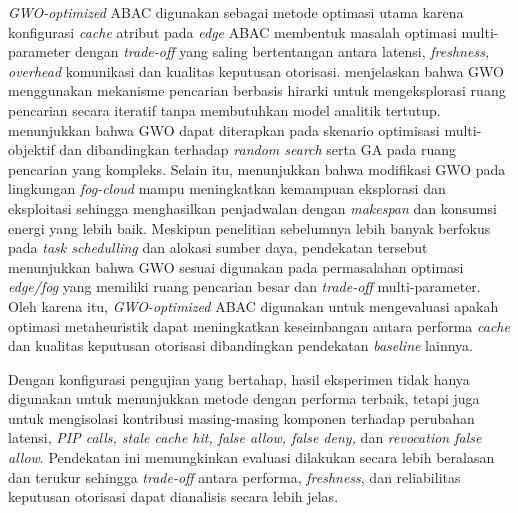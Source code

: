 \textit{GWO-optimized} ABAC digunakan sebagai metode optimasi utama karena konfigurasi \textit{cache} atribut pada \textit{edge} ABAC membentuk masalah optimasi multi-parameter dengan \textit{trade-off} yang saling bertentangan antara latensi, \textit{freshness, overhead} komunikasi dan kualitas keputusan otorisasi. \textcite{mirjalili_grey_2014} menjelaskan bahwa GWO menggunakan mekanisme pencarian berbasis hirarki untuk mengeksplorasi ruang pencarian secara iteratif tanpa membutuhkan model analitik tertutup. \textcite{feng_dynamic_2025} menunjukkan bahwa GWO dapat diterapkan pada skenario optimisasi multi-objektif dan dibandingkan terhadap \textit{random search} serta GA pada ruang pencarian yang kompleks. Selain itu, \textcite{alsadie_modified_2025} menunjukkan bahwa modifikasi GWO pada lingkungan \textit{fog-cloud} mampu meningkatkan kemampuan eksplorasi dan eksploitasi sehingga menghasilkan penjadwalan dengan \textit{makespan} dan konsumsi energi yang lebih baik. Meskipun penelitian sebelumnya lebih banyak berfokus pada \textit{task schedulling} dan alokasi sumber daya, pendekatan tersebut menunjukkan bahwa GWO sesuai digunakan pada permasalahan optimasi \textit{edge/fog} yang memiliki ruang pencarian besar dan \textit{trade-off} multi-parameter. Oleh karena itu, \textit{GWO-optimized} ABAC digunakan untuk mengevaluasi apakah optimasi metaheuristik dapat meningkatkan keseimbangan antara performa \textit{cache} dan kualitas keputusan otorisasi dibandingkan pendekatan \textit{baseline} lainnya.

Dengan konfigurasi pengujian yang bertahap, hasil eksperimen tidak hanya digunakan untuk menunjukkan metode dengan performa terbaik, tetapi juga untuk mengisolasi kontribusi masing-masing komponen terhadap perubahan latensi, \textit{PIP calls, stale cache hit, false allow, false deny,} dan \textit{revocation false allow}. Pendekatan ini memungkinkan evaluasi dilakukan secara lebih beralasan dan terukur sehingga \textit{trade-off} antara performa, \textit{freshness}, dan reliabilitas keputusan otorisasi dapat dianalisis secara lebih jelas.